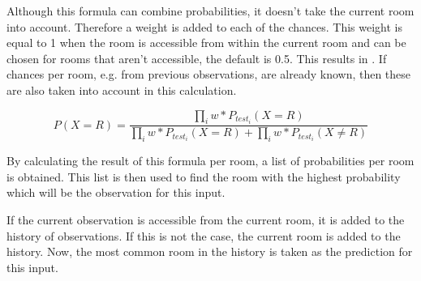 Although this formula can combine probabilities, it doesn't take the current room into account. Therefore a weight is added to each of the chances. This weight is equal to 1 when the room is accessible from within the current room and can be chosen for rooms that aren't accessible, the default is 0.5. This results in . If chances per room, e.g. from previous observations, are already known, then these are also taken into account in this calculation.

\begin{equation}
    \label{eq:combine-chances-next-level}
    P(X = R) = \frac{\prod_{i} w * P_{test_i}(X = R)}{\prod_{i} w * P_{test_i}(X = R) + \prod_{i} w * P_{test_i}(X \ne R)}
\end{equation}

By calculating the result of this formula per room, a list of probabilities per room is obtained. This list is then used to find the room with the highest probability which will be the observation for this input.

If the current observation is accessible from the current room, it is added to the history of observations. If this is not the case, the current room is added to the history. Now, the most common room in the history is taken as the prediction for this input.
